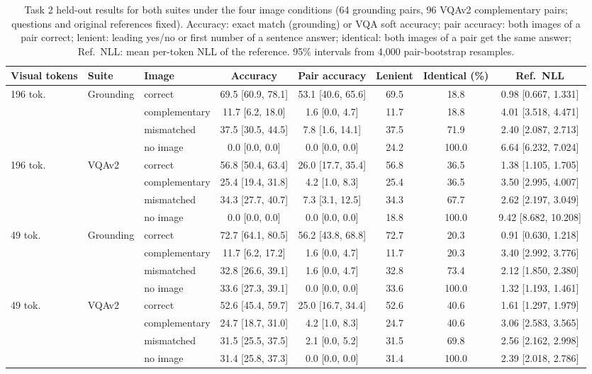 \begin{table}[htbp]
\centering
\small
\caption{Task 2 held-out results for both suites under the four image conditions (64 grounding pairs, 96 VQAv2 complementary pairs; questions and original references fixed). Accuracy: exact match (grounding) or VQA soft accuracy; pair accuracy: both images of a pair correct; lenient: leading yes/no or first number of a sentence answer; identical: both images of a pair get the same answer; Ref.\ NLL: mean per-token NLL of the reference. 95\% intervals from 4{,}000 pair-bootstrap resamples.}
\label{tab:t2-final}
\begin{adjustbox}{max width=\linewidth}
\begin{tabular}{lllccccc}
\toprule
Visual tokens & Suite & Image & Accuracy & Pair accuracy & Lenient & Identical (\%) & Ref.\ NLL \\
\midrule
196 tok. & Grounding & correct & 69.5 [60.9, 78.1] & 53.1 [40.6, 65.6] & 69.5 & 18.8 & 0.98 [0.667, 1.331] \\
 &  & complementary & 11.7 [6.2, 18.0] & 1.6 [0.0, 4.7] & 11.7 & 18.8 & 4.01 [3.518, 4.471] \\
 &  & mismatched & 37.5 [30.5, 44.5] & 7.8 [1.6, 14.1] & 37.5 & 71.9 & 2.40 [2.087, 2.713] \\
 &  & no image & 0.0 [0.0, 0.0] & 0.0 [0.0, 0.0] & 24.2 & 100.0 & 6.64 [6.232, 7.024] \\
\midrule
196 tok. & VQAv2 & correct & 56.8 [50.4, 63.4] & 26.0 [17.7, 35.4] & 56.8 & 36.5 & 1.38 [1.105, 1.705] \\
 &  & complementary & 25.4 [19.4, 31.8] & 4.2 [1.0, 8.3] & 25.4 & 36.5 & 3.50 [2.995, 4.007] \\
 &  & mismatched & 34.3 [27.7, 40.7] & 7.3 [3.1, 12.5] & 34.3 & 67.7 & 2.62 [2.197, 3.049] \\
 &  & no image & 0.0 [0.0, 0.0] & 0.0 [0.0, 0.0] & 18.8 & 100.0 & 9.42 [8.682, 10.208] \\
\midrule
49 tok. & Grounding & correct & 72.7 [64.1, 80.5] & 56.2 [43.8, 68.8] & 72.7 & 20.3 & 0.91 [0.630, 1.218] \\
 &  & complementary & 11.7 [6.2, 17.2] & 1.6 [0.0, 4.7] & 11.7 & 20.3 & 3.40 [2.992, 3.776] \\
 &  & mismatched & 32.8 [26.6, 39.1] & 1.6 [0.0, 4.7] & 32.8 & 73.4 & 2.12 [1.850, 2.380] \\
 &  & no image & 33.6 [27.3, 39.1] & 0.0 [0.0, 0.0] & 33.6 & 100.0 & 1.32 [1.193, 1.461] \\
\midrule
49 tok. & VQAv2 & correct & 52.6 [45.4, 59.7] & 25.0 [16.7, 34.4] & 52.6 & 40.6 & 1.61 [1.297, 1.979] \\
 &  & complementary & 24.7 [18.7, 31.0] & 4.2 [1.0, 8.3] & 24.7 & 40.6 & 3.06 [2.583, 3.565] \\
 &  & mismatched & 31.5 [25.5, 37.5] & 2.1 [0.0, 5.2] & 31.5 & 69.8 & 2.56 [2.162, 2.998] \\
 &  & no image & 31.4 [25.8, 37.3] & 0.0 [0.0, 0.0] & 31.4 & 100.0 & 2.39 [2.018, 2.786] \\
\bottomrule
\end{tabular}
\end{adjustbox}
\end{table}
